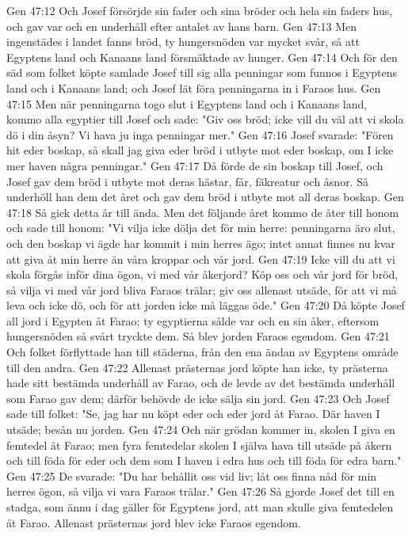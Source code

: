 Gen 47:12  Och Josef försörjde sin fader och sina bröder och hela sin faders hus, och gav var och en underhåll efter antalet av hans barn.
Gen 47:13  Men ingenstädes i landet fanns bröd, ty hungersnöden var mycket svår, så att Egyptens land och Kanaans land försmäktade av hunger.
Gen 47:14  Och för den säd som folket köpte samlade Josef till sig alla penningar som funnos i Egyptens land och i Kanaans land; och Josef lät föra penningarna in i Faraos hus.
Gen 47:15  Men när penningarna togo slut i Egyptens land och i Kanaans land, kommo alla egyptier till Josef och sade: "Giv oss bröd; icke vill du väl att vi skola dö i din åsyn? Vi hava ju inga penningar mer."
Gen 47:16  Josef svarade: "Fören hit eder boskap, så skall jag giva eder bröd i utbyte mot eder boskap, om I icke mer haven några penningar."
Gen 47:17  Då förde de sin boskap till Josef, och Josef gav dem bröd i utbyte mot deras hästar, får, fäkreatur och åsnor. Så underhöll han dem det året och gav dem bröd i utbyte mot all deras boskap.
Gen 47:18  Så gick detta år till ända. Men det följande året kommo de åter till honom och sade till honom: "Vi vilja icke dölja det för min herre: penningarna äro slut, och den boskap vi ägde har kommit i min herres ägo; intet annat finnes nu kvar att giva åt min herre än våra kroppar och vår jord.
Gen 47:19  Icke vill du att vi skola förgås inför dina ögon, vi med vår åkerjord? Köp oss och vår jord för bröd, så vilja vi med vår jord bliva Faraos trälar; giv oss allenast utsäde, för att vi må leva och icke dö, och för att jorden icke må läggas öde."
Gen 47:20  Då köpte Josef all jord i Egypten åt Farao; ty egyptierna sålde var och en sin åker, eftersom hungersnöden så svårt tryckte dem. Så blev jorden Faraos egendom.
Gen 47:21  Och folket förflyttade han till städerna, från den ena ändan av Egyptens område till den andra.
Gen 47:22  Allenast prästernas jord köpte han icke, ty prästerna hade sitt bestämda underhåll av Farao, och de levde av det bestämda underhåll som Farao gav dem; därför behövde de icke sälja sin jord.
Gen 47:23  Och Josef sade till folket: "Se, jag har nu köpt eder och eder jord åt Farao. Där haven I utsäde; besån nu jorden.
Gen 47:24  Och när grödan kommer in, skolen I giva en femtedel åt Farao; men fyra femtedelar skolen I själva hava till utsäde på åkern och till föda för eder och dem som I haven i edra hus och till föda för edra barn."
Gen 47:25  De svarade: "Du har behållit oss vid liv; låt oss finna nåd för min herres ögon, så vilja vi vara Faraos trälar."
Gen 47:26  Så gjorde Josef det till en stadga, som ännu i dag gäller för Egyptens jord, att man skulle giva femtedelen åt Farao. Allenast prästernas jord blev icke Faraos egendom.
